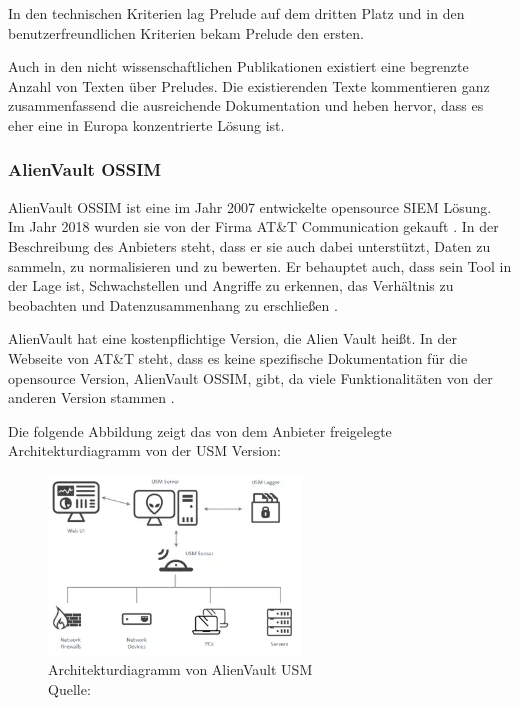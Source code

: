 In den technischen Kriterien lag Prelude auf dem dritten Platz und in den benutzerfreundlichen Kriterien bekam Prelude den ersten. 

Auch in den nicht wissenschaftlichen Publikationen existiert eine begrenzte Anzahl von Texten über Preludes. Die existierenden Texte kommentieren ganz zusammenfassend die ausreichende Dokumentation und heben hervor, dass es eher eine in Europa konzentrierte Lösung ist.

\subsubsection{AlienVault OSSIM}
AlienVault OSSIM ist eine im Jahr 2007 entwickelte \gls{opensource} \gls{SIEM} Lösung. Im Jahr 2018 wurden sie von der Firma AT\&T Communication gekauft  \citep{CBN_AV}. In der Beschreibung des Anbieters steht, dass er sie auch dabei unterstützt, Daten zu sammeln, zu normalisieren und zu bewerten. Er behauptet auch, dass sein Tool in der Lage ist, Schwachstellen und Angriffe zu erkennen, das Verhältnis zu beobachten und Datenzusammenhang zu erschließen \citep{ATT_AVO}. 

AlienVault hat eine kostenpflichtige Version, die Alien Vault  heißt. In der Webseite von AT\&T steht, dass es keine spezifische Dokumentation für die \gls{opensource} Version, AlienVault OSSIM, gibt, da viele Funktionalitäten von der anderen Version stammen \citep{ATT_AVO}. 

\newpage
Die folgende Abbildung zeigt das von dem Anbieter freigelegte Architekturdiagramm von der \gls{USM} Version:

\begin{figure}[H]
   \centering
   \includegraphics[width=0.6\textwidth]{assets/2_p6.png}
   \caption{Architekturdiagramm  von AlienVault \gls{USM} \\Quelle: \citep{ATT_AVO} }
   \centering
\end{figure}

